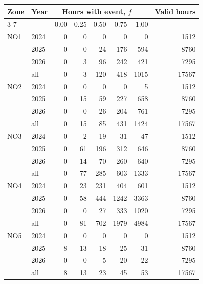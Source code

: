 \begin{tabular}{llrrrrrr}
\toprule
Zone & Year & \multicolumn{5}{c}{Hours with event, $f =$} & Valid hours \\
\cmidrule(lr){3-7}
 & & 0.00 & 0.25 & 0.50 & 0.75 & 1.00 & \\
\midrule
NO1 & 2024 & 0 & 0 & 0 & 0 & 0 & 1512 \\
 & 2025 & 0 & 0 & 24 & 176 & 594 & 8760 \\
 & 2026 & 0 & 3 & 96 & 242 & 421 & 7295 \\
 & all & 0 & 3 & 120 & 418 & 1015 & 17567 \\
\addlinespace
NO2 & 2024 & 0 & 0 & 0 & 0 & 5 & 1512 \\
 & 2025 & 0 & 15 & 59 & 227 & 658 & 8760 \\
 & 2026 & 0 & 0 & 26 & 204 & 761 & 7295 \\
 & all & 0 & 15 & 85 & 431 & 1424 & 17567 \\
\addlinespace
NO3 & 2024 & 0 & 2 & 19 & 31 & 47 & 1512 \\
 & 2025 & 0 & 61 & 196 & 312 & 646 & 8760 \\
 & 2026 & 0 & 14 & 70 & 260 & 640 & 7295 \\
 & all & 0 & 77 & 285 & 603 & 1333 & 17567 \\
\addlinespace
NO4 & 2024 & 0 & 23 & 231 & 404 & 601 & 1512 \\
 & 2025 & 0 & 58 & 444 & 1242 & 3363 & 8760 \\
 & 2026 & 0 & 0 & 27 & 333 & 1020 & 7295 \\
 & all & 0 & 81 & 702 & 1979 & 4984 & 17567 \\
\addlinespace
NO5 & 2024 & 0 & 0 & 0 & 0 & 0 & 1512 \\
 & 2025 & 8 & 13 & 18 & 25 & 31 & 8760 \\
 & 2026 & 0 & 0 & 5 & 20 & 22 & 7295 \\
 & all & 8 & 13 & 23 & 45 & 53 & 17567 \\
\bottomrule
\end{tabular}
